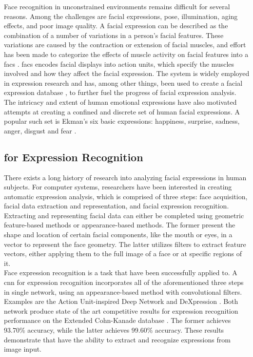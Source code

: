 Face recognition in unconstrained environments remains difficult for several reasons. Among the challenges are facial expressions, pose, illumination, aging effects, and poor image quality. A facial expression can be described as the combination of a number of variations in a person's facial features. These variations are caused by the contraction or extension of facial muscles, and effort has been made to categorize the effects of muscle activity on facial features into a \acrfull{facs} \cite{facs}. \acrshort{facs} encodes facial displays into action units, which specify the muscles involved and how they affect the facial expression. The system is widely employed in expression research and has, among other things, been used to create a facial expression database \cite{exp-db}, to further fuel the progress of facial expression analysis. The intricacy and extent of human emotional expressions have also motivated attempts at creating a confined and discrete set of human facial expressions. A popular such set is Ekman's six basic expressions: happiness, surprise, sadness, anger, disgust and fear \cite{ekman}.

\subsection{ for Expression Recognition}

There exists a long history of research into analyzing facial expressions in human subjects. For computer systems, researchers have been interested in creating automatic expression analysis, which is comprised of three steps: face acquisition, facial data extraction and representation, and facial expression recognition. Extracting and representing facial data can either be completed using geometric feature-based methods or appearance-based methods. The former present the shape and location of certain facial components, like the mouth or eyes, in a vector to represent the face geometry. The latter utilizes filters to extract feature vectors, either applying them to the full image of a face or at specific regions of it. \\

\noindent Face expression recognition is a task that  have been successfully applied to. A \acrshort{cnn} for expression recognition incorporates all of the aforementioned three steps in single network, using an appearance-based method with convolutional filters. Examples are the Action Unit-inspired Deep Network \cite{audn} and DeXpression \cite{dexpression}. Both network produce state of the art competitive results for expression recognition performance on the Extended Cohn-Kanade database \cite{ck-plus}. The former achieves 93.70\% accuracy, while the latter achieves 99.60\% accuracy. These results demonstrate that  have the ability to extract and recognize expressions from image input. 

